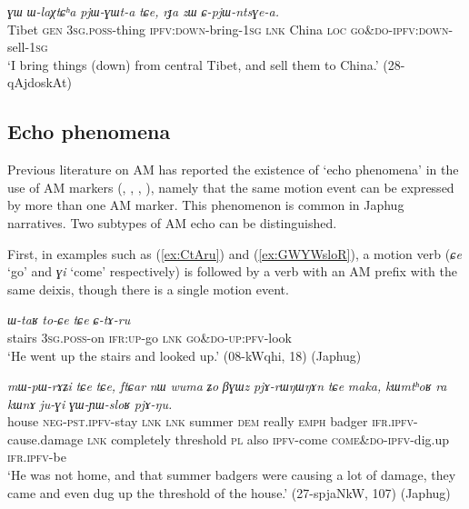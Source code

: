\documentclass[oneside,a4paper,11pt]{article}
\newcommand{\ipa}[1]{{\phon\textit{#1}}}
\newcommand{\japhug}[2]{\textit{\phon#1} `#2'}
\newcommand{\rouge}[1]{{\color{red}#1}}
\begin{document}
\begin{exe}
\ex \label{ex:pjWGWta2}
\gll \ipa{pot} 	\ipa{ɣɯ} 	\ipa{ɯ-laχtɕʰa} 	\ipa{pjɯ-ɣɯt-a} 	\ipa{tɕe,} 	\ipa{rɟa} 	\ipa{zɯ} 	\ipa{ɕ-pjɯ-ntsɣe-a.}  \\
Tibet \textsc{gen} \textsc{3sg}.\textsc{poss}-thing  \textsc{ipfv}:\textsc{down}-bring-\textsc{1sg} \textsc{lnk} China \textsc{loc} \textsc{\rouge{go\&do}}-\textsc{ipfv}:\textsc{down}-sell-\textsc{1sg} \\
\glt `I bring things (down) from central Tibet, and sell them to China.' (28-qAjdoskAt)
\end{exe}


\subsection{Echo phenomena} \label{sec:AM.echo}
Previous literature on AM has reported the existence of `echo phenomena' in the use of AM markers (\citealt[251]{wilkins91associated.motion}, \citealt[681-683]{vuillermet12eseejja}, \citealt[128-130]{rose15am}, \citealt[11]{guillaume16am}), namely that the same motion event can be expressed by more than one AM marker. This phenomenon is common in Japhug narratives. Two subtypes of AM echo can be distinguished.

First, in examples such as (\ref{ex:CtAru}) and (\ref{ex:GWYWsloR}), a motion verb (\japhug{ɕe}{go} and \japhug{ɣi}{come} respectively) is followed by a verb with an AM prefix with the same deixis, though there is a single motion event.

\begin{exe}
\ex \label{ex:CtAru}
\gll \ipa{tɕʰi}	\ipa{ɯ-taʁ}	\ipa{to-ɕe}	\ipa{tɕe}	\ipa{\rouge{ɕ}-tɤ-ru}   \\
stairs \textsc{3sg}.\textsc{poss}-on \textsc{ifr}:\textsc{up}-go \textsc{lnk}  \rouge{\textsc{go\&do}}-\textsc{up}:\textsc{pfv}-look \\
\glt `He went up the stairs and looked up.'  (08-kWqhi, 18) (Japhug)
\end{exe}

\begin{exe}
\ex \label{ex:GWYWsloR}
\gll \ipa{kʰa}	\ipa{mɯ-pɯ-rɤʑi}	\ipa{tɕe}	\ipa{tɕe,}	\ipa{ftɕar}	\ipa{nɯ}	\ipa{wuma}	\ipa{ʑo}	\ipa{βɣɯz}	\ipa{pjɤ-rɯŋɯŋɤn}	\ipa{tɕe}	\ipa{maka,}	\ipa{kɯmtʰoʁ}	\ipa{ra}	\ipa{kɯnɤ}	\ipa{ju-ɣi}	\ipa{\rouge{ɣɯ}-ɲɯ-sloʁ}	\ipa{pjɤ-ŋu.} \\
house \textsc{neg}-\textsc{pst}.\textsc{ipfv}-stay \textsc{lnk} \textsc{lnk} summer \textsc{dem} really \textsc{emph} badger \textsc{ifr}.\textsc{ipfv}-cause.damage \textsc{lnk} completely threshold \textsc{pl} also \textsc{ipfv}-come \rouge{\textsc{come\&do}}-\textsc{ipfv}-dig.up \textsc{ifr}.\textsc{ipfv}-be \\
\glt `He was not home, and that summer badgers were causing a lot of damage, they came and even dug up  the threshold of the house.'  (27-spjaNkW, 107) (Japhug)
\end{exe}
\end{document}
